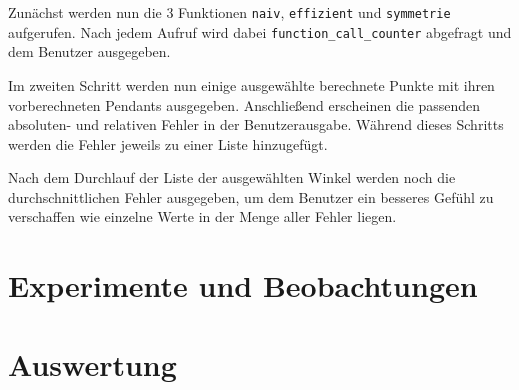 \documentclass{scrartcl}
\begin{document}
	Zunächst werden nun die 3 Funktionen \verb|naiv|, \verb|effizient| und \verb|symmetrie| aufgerufen. Nach jedem Aufruf wird dabei \verb|function_call_counter| abgefragt und dem Benutzer ausgegeben.
	
	Im zweiten Schritt werden nun einige ausgewählte berechnete Punkte mit ihren vorberechneten Pendants ausgegeben. Anschließend erscheinen die passenden absoluten- und relativen Fehler in der Benutzerausgabe. Während dieses Schritts werden die Fehler jeweils zu einer Liste hinzugefügt.
	
	Nach dem Durchlauf der Liste der ausgewählten Winkel werden noch die durchschnittlichen Fehler ausgegeben, um dem Benutzer ein besseres Gefühl zu verschaffen wie einzelne Werte in der Menge aller Fehler liegen.
	
	
	
	\section{Experimente und Beobachtungen}
	
	
	
	\section{Auswertung}	
	
\end{document}
